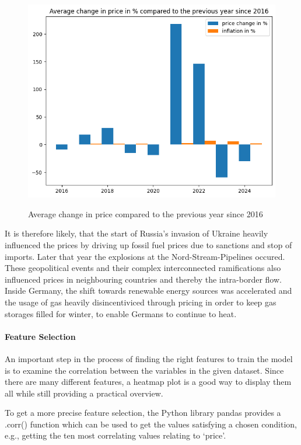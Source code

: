 \documentclass[a4paper]{article}
\begin{document}
\begin{figure}
\centering
{\includegraphics[keepaspectratio]{src/image-6.png}}
\caption{Average change in price compared to the previous year since
2016}
\end{figure}

It is therefore likely, that the start of Russia's invasion of Ukraine
heavily influenced the prices by driving up fossil fuel prices due to
sanctions and stop of imports. Later that year the explosions at the
Nord-Stream-Pipelines occured. These geopolitical events and their
complex interconnected ramifications also influenced prices in
neighbouring countries and thereby the intra-border flow. Inside
Germany, the shift towards renewable energy sources was accelerated and
the usage of gas heavily disincentiviced through pricing in order to
keep gas storages filled for winter, to enable Germans to continue to
heat.

    \paragraph{Feature Selection}\label{feature-selection}

An important step in the process of finding the right features to train
the model is to examine the correlation between the variables in the
given dataset. Since there are many different features, a heatmap plot
is a good way to display them all while still providing a practical
overview.

To get a more precise feature selection, the Python library pandas
provides a .corr() function which can be used to get the values
satisfying a chosen condition, e.g., getting the ten most correlating
values relating to `price'.
\end{document}
